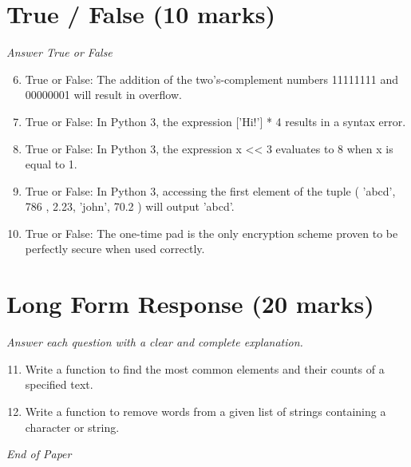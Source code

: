 \documentclass[12pt]{article}
\begin{document}
\section*{True / False (10 marks)}
\textit{Answer True or False}
\begin{enumerate}[label=\arabic*.]
\setcounter{enumi}{5}
\item True or False: The addition of the two's-complement numbers 11111111 and 00000001 will result in overflow.
\item True or False: In Python 3, the expression ['Hi!'] * 4 results in a syntax error.
\item True or False: In Python 3, the expression x \textless{}\textless{} 3 evaluates to 8 when x is equal to 1.
\item True or False: In Python 3, accessing the first element of the tuple ( 'abcd', 786 , 2.23, 'john', 70.2 ) will output 'abcd'.
\item True or False: The one-time pad is the only encryption scheme proven to be perfectly secure when used correctly.
\end{enumerate}

\section*{Long Form Response (20 marks)}
\textit{Answer each question with a clear and complete explanation.}
\begin{enumerate}[label=\arabic*.]
\setcounter{enumi}{10}
\item Write a function to find the most common elements and their counts of a specified text.
\item Write a function to remove words from a given list of strings containing a character or string.
\end{enumerate}

\vfill
\noindent\textit{End of Paper}
\end{document}
